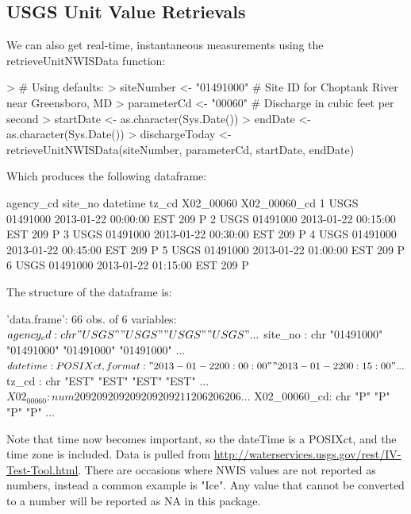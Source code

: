 \documentclass[a4paper,11pt]{article}
\begin{document}
\subsection{USGS Unit Value Retrievals}
We can also get real-time, instantaneous measurements using the retrieveUnitNWISData function:
\begin{Schunk}
\begin{Sinput}
> # Using defaults:
> siteNumber <- "01491000" # Site ID for Choptank River near Greensboro, MD
> parameterCd <- "00060"  # Discharge in cubic feet per second
> startDate <- as.character(Sys.Date())
> endDate <- as.character(Sys.Date())
> dischargeToday <- retrieveUnitNWISData(siteNumber, parameterCd, startDate, endDate)
\end{Sinput}
\end{Schunk}
Which produces the following dataframe:
\begin{Schunk}
\begin{Soutput}
  agency_cd  site_no            datetime tz_cd X02_00060 X02_00060_cd
1      USGS 01491000 2013-01-22 00:00:00   EST       209            P
2      USGS 01491000 2013-01-22 00:15:00   EST       209            P
3      USGS 01491000 2013-01-22 00:30:00   EST       209            P
4      USGS 01491000 2013-01-22 00:45:00   EST       209            P
5      USGS 01491000 2013-01-22 01:00:00   EST       209            P
6      USGS 01491000 2013-01-22 01:15:00   EST       209            P
\end{Soutput}
\end{Schunk}
The structure of the dataframe is:
\begin{Schunk}
\begin{Soutput}
'data.frame':	66 obs. of  6 variables:
 $ agency_cd   : chr  "USGS" "USGS" "USGS" "USGS" ...
 $ site_no     : chr  "01491000" "01491000" "01491000" "01491000" ...
 $ datetime    : POSIXct, format: "2013-01-22 00:00:00" "2013-01-22 00:15:00" ...
 $ tz_cd       : chr  "EST" "EST" "EST" "EST" ...
 $ X02_00060   : num  209 209 209 209 209 209 211 206 206 206 ...
 $ X02_00060_cd: chr  "P" "P" "P" "P" ...
\end{Soutput}
\end{Schunk}
Note that time now becomes important, so the dateTime is a POSIXct, and the time zone is included. Data is pulled from \url{http://waterservices.usgs.gov/rest/IV-Test-Tool.html}. There are occasions where NWIS values are not reported as numbers, instead a common example is "Ice".  Any value that cannot be converted to a number will be reported as NA in this package.
\end{document}
